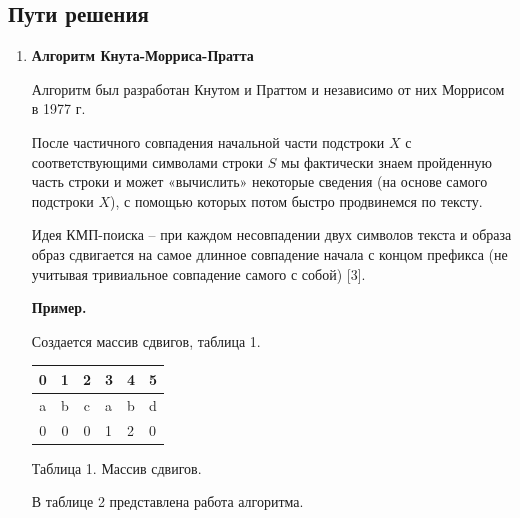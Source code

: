 \documentclass[a4paper,14pt]{article} %
\begin{document}
        \subsection{Пути решения}
        \begin{enumerate}
        \item \textbf{Алгоритм Кнута-Морриса-Пратта}
        
        Алгоритм был разработан Кнутом и Праттом и независимо от них Моррисом в 1977 г.
        
        После частичного совпадения начальной части подстроки $X$ с соответствующими символами строки $S$ мы фактически знаем пройденную часть строки и может «вычислить» некоторые сведения (на основе самого подстроки $X$), с помощью которых потом быстро продвинемся по тексту.
        
        Идея КМП-поиска -- при каждом несовпадении двух символов текста и образа образ сдвигается на самое длинное совпадение начала с концом префикса (не учитывая тривиальное совпадение самого с собой) [3].
        
        \textbf{Пример. }
        
        Создается массив сдвигов, таблица 1. 
        
        \begin{center}
	\begin{tabular}{|c|c|c|l|l|l|}
	\hline
	0 & 1 & 2 & 3 & 4 & 5 \\ \hline
	a & b & c & a & b & d \\ \hline
	0 & 0 & 0 & 1 & 2 & 0 \\ \hline
	\end{tabular}
	
	Таблица 1.
	Массив сдвигов.  
	\end{center}
	
        В таблице 2 представлена работа алгоритма. 	


\end{enumerate}
\end{document}
